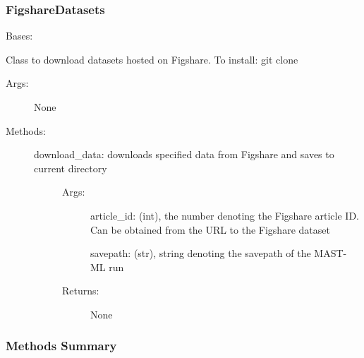 \documentclass[letterpaper,10pt,english]{sphinxmanual}
\begin{document}
\subsubsection{FigshareDatasets}
\label{\detokenize{api/mastml.datasets.FigshareDatasets:figsharedatasets}}\label{\detokenize{api/mastml.datasets.FigshareDatasets::doc}}

\begin{fulllineitems}
\label{\detokenize{api/mastml.datasets.FigshareDatasets:mastml.datasets.FigshareDatasets}}
Bases: 

Class to download datasets hosted on Figshare. To install: git clone 
\begin{description}
\item[{Args:}] \leavevmode
None

\item[{Methods:}] \leavevmode\begin{description}
\item[{download\_data: downloads specified data from Figshare and saves to current directory}] \leavevmode\begin{description}
\item[{Args:}] \leavevmode
article\_id: (int), the number denoting the Figshare article ID. Can be obtained from the URL to the Figshare dataset

savepath: (str), string denoting the savepath of the MAST-ML run

\item[{Returns:}] \leavevmode
None

\end{description}

\end{description}

\end{description}
\subsubsection*{Methods Summary}


\begin{savenotes}\sphinxatlongtablestart\begin{longtable}[c]{}
\hline


\end{longtable}
\end{savenotes}
\end{fulllineitems}
\end{document}
